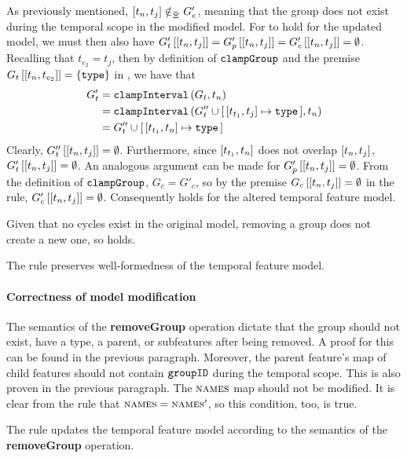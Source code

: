    As previously mentioned, $\interval{t_n}{t_j} \notinnr G'_e$, meaning that the group does not exist during the temporal scope in the modified model. For  to hold for the updated model, we must then also have $\lookup{G'_t}{\interval{t_n}{t_j}} = \lookup{G'_p}{\interval{t_n}{t_j}} = \lookup{G'_c}{\interval{t_n}{t_j}} = \emptyset$. Recalling that $t_{e_2} = t_j$, then by definition of $\texttt{clampGroup}$ and the premise $\lookup{G_t}{\interval{t_n}{t_{e_2}}} = \set{\var{type}}$ in , we have that
\begin{align*}
   G'_t &= \var{clampInterval}\left(G_t, t_n\right) \\
        &= \var{clampInterval}\left(G''_t \cup \intervalmapping{t_{t_1}}{t_j}{\var{type}}, t_n\right) \\
        &= G''_t \cup \intervalmapping{t_{t_1}}{t_n}{\var{type}}
\end{align*}
Clearly, $\lookup{G''_t}{\interval{t_n}{t_j}} = \emptyset$.  Furthermore, since $\interval{t_{t_1}}{t_n}$ does not overlap $\interval{t_n}{t_j}$, $\lookup{G'_t}{\interval{t_n}{t_j}} = \emptyset$. An analogous argument can be made for $\lookup{G'_p}{\interval{t_n}{t_j}} = \emptyset$. From the definition of $\texttt{clampGroup}$, $G_c = G'_c$, so by the premise $\lookup{G_c}{\interval{t_n}{t_j}} = \emptyset$ in the rule, $\lookup{G_c'}{\interval{t_n}{t_j}} = \emptyset$. Consequently  holds for the altered temporal feature model.

Given that no cycles exist in the original model, removing a group does not create a new one, so  holds.
\\

\begin{lemma}
   The  rule preserves well-formedness of the temporal feature model.
   \label{lemma:remove-group-well-formed}
\end{lemma}

\paragraph{Correctness of model modification}
The semantics of the \textbf{removeGroup} operation dictate that the group should not exist, have a type, a parent, or subfeatures after being removed. A proof for this can be found in the previous paragraph. Moreover, the parent feature's map of child features should not contain $\texttt{groupID}$ during the temporal scope. This is also proven in the previous paragraph. The $\textsc{names}{}$ map should not be modified. It is clear from the rule that $\textsc{names}{} = \textsc{names}{}'$, so this condition, too, is true.
\\

\begin{lemma}
   The  rule updates the temporal feature model according to the semantics of the \textbf{removeGroup} operation.
   \label{lemma:remove-group-mod}
\end{lemma}
